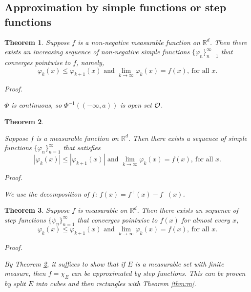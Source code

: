 \documentclass[
]{book}
\newtheorem{theorem}{Theorem}[chapter]
\theoremstyle{definition}
\theoremstyle{definition}
\theoremstyle{definition}
\theoremstyle{definition}
\theoremstyle{remark}
\begin{document}
\subsection{Approximation by simple functions or step functions}\label{approximation-by-simple-functions-or-step-functions}

\begin{theorem}
\leavevmode

Suppose \(f\) is a non-negative measurable function on \(\mathbb{R}^d\). Then there exists an increasing sequence of non-negative simple functions \(\{\varphi_n\}_{n=1}^{\infty}\) that converges pointwise to \(f\), namely,
\[
\varphi_k(x)\le\varphi_{k+1}(x) \text{ and } \lim_{k\to \infty}\varphi_k(x)=f(x),\ \text{for all }x.
\]

\emph{Proof.}

\(\Phi\) is continuous, so \(\Phi^{-1}((-\infty,a))\) is open set \(\cal O\).

\end{theorem}

\begin{theorem}
\protect\hypertarget{thm:s}{}\label{thm:s}\leavevmode

Suppose \(f\) is a measurable function on \(\mathbb{R}^d\). Then there exists a sequence of simple functions \(\{\varphi_n\}_{n=1}^{\infty}\) that satisfies
\[
|\varphi_k(x)|\le|\varphi_{k+1}(x)| \text{ and } \lim_{k\to \infty}\varphi_k(x)=f(x),\ \text{for all }x.
\]

\emph{Proof.}

We use the decomposition of \(f\): \(f(x)=f^{+}(x)-f^{-}(x)\).

\end{theorem}

\begin{theorem}
\leavevmode

Suppose \(f\) is measurable on \(\mathbb{R}^d\). Then there exists an sequence of step functions \(\{\psi_n\}_{n=1}^{\infty}\) that converges pointwise to \(f(x)\) for almost every \(x\),
\[
\varphi_k(x)\le\varphi_{k+1}(x) \text{ and } \lim_{k\to \infty}\varphi_k(x)=f(x),\ \text{for all }x.
\]

\emph{Proof.}

By Theorem \ref{thm:s}, it suffices to show that if \(E\) is a measurable set with finite measure, then \(f=\chi_E\) can be approximated by step functions. This can be proven by split \(E\) into cubes and then rectangles with Theorem \ref{thm:m}.

\end{theorem}
\end{document}
